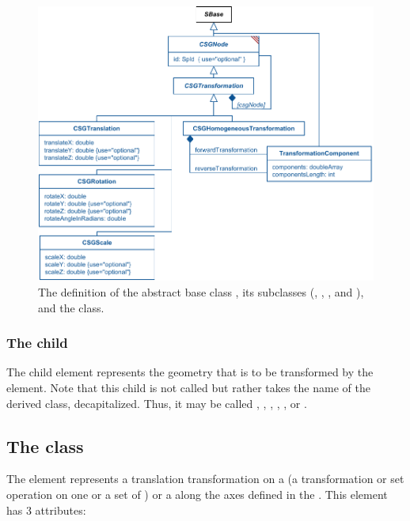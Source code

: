 \begin{figure}[ht]
  \includegraphics{figs/CSGTransformation-uml}
  \caption{The definition of the abstract base class \CSGTransformation, its subclasses (\CSGTranslation, \CSGRotation, \CSGScale, and \CSGHomogeneousTransformation), and the \TransformationComponent class.}
  \label{CSGTransformation-uml}
  \label{CSGRotation-uml}
  \label{CSGScale-uml}
  \label{CSGHomogeneousTransformation-uml}
  \label{TransformationComponent-uml}
\end{figure}

\subsubsection{The \fixttspace{} child}

The child  element represents the geometry that is to be transformed by the \CSGTransformation element.  Note that this child is not called  but rather takes the name of the derived class, decapitalized.  Thus, it may be called , , , , , or .


\subsection{The  class}
\label{csgtranslation-class}
The \CSGTranslation element represents a translation transformation on a \CSGNode (a transformation or set operation on one or a set of \CSGPrimitives) or a \CSGPrimitive along the axes defined in the \Geometry. This element has 3 attributes:

